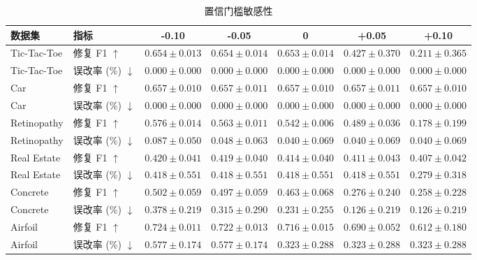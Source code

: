 \begin{table}[tb]
\centering
\caption{置信门槛敏感性}
\label{tab:threshold-main}
\fontsize{8}{9.6}\selectfont
\setlength{\tabcolsep}{3pt}
\renewcommand{\arraystretch}{1.10}
\begin{tabular*}{\textwidth}{@{\extracolsep{\fill}}llccccc@{}}
\toprule
数据集 & 指标 & -0.10 & -0.05 & 0 & +0.05 & +0.10 \\
\midrule
Tic-Tac-Toe & 修复 F1 $\uparrow$ & $0.654\pm0.013$ & $0.654\pm0.014$ & $0.653\pm0.014$ & $0.427\pm0.370$ & $0.211\pm0.365$ \\
Tic-Tac-Toe & 误改率 (\%) $\downarrow$ & $0.000\pm0.000$ & $0.000\pm0.000$ & $0.000\pm0.000$ & $0.000\pm0.000$ & $0.000\pm0.000$ \\
\addlinespace[2pt]
Car & 修复 F1 $\uparrow$ & $0.657\pm0.010$ & $0.657\pm0.011$ & $0.657\pm0.010$ & $0.657\pm0.011$ & $0.657\pm0.010$ \\
Car & 误改率 (\%) $\downarrow$ & $0.000\pm0.000$ & $0.000\pm0.000$ & $0.000\pm0.000$ & $0.000\pm0.000$ & $0.000\pm0.000$ \\
\addlinespace[2pt]
Retinopathy & 修复 F1 $\uparrow$ & $0.576\pm0.014$ & $0.563\pm0.011$ & $0.542\pm0.006$ & $0.489\pm0.036$ & $0.178\pm0.199$ \\
Retinopathy & 误改率 (\%) $\downarrow$ & $0.087\pm0.050$ & $0.048\pm0.063$ & $0.040\pm0.069$ & $0.040\pm0.069$ & $0.040\pm0.069$ \\
\addlinespace[2pt]
Real Estate & 修复 F1 $\uparrow$ & $0.420\pm0.041$ & $0.419\pm0.040$ & $0.414\pm0.040$ & $0.411\pm0.043$ & $0.407\pm0.042$ \\
Real Estate & 误改率 (\%) $\downarrow$ & $0.418\pm0.551$ & $0.418\pm0.551$ & $0.418\pm0.551$ & $0.418\pm0.551$ & $0.279\pm0.318$ \\
\addlinespace[2pt]
Concrete & 修复 F1 $\uparrow$ & $0.502\pm0.059$ & $0.497\pm0.059$ & $0.463\pm0.068$ & $0.276\pm0.240$ & $0.258\pm0.228$ \\
Concrete & 误改率 (\%) $\downarrow$ & $0.378\pm0.219$ & $0.315\pm0.290$ & $0.231\pm0.255$ & $0.126\pm0.219$ & $0.126\pm0.219$ \\
\addlinespace[2pt]
Airfoil & 修复 F1 $\uparrow$ & $0.724\pm0.011$ & $0.722\pm0.013$ & $0.716\pm0.015$ & $0.690\pm0.052$ & $0.612\pm0.180$ \\
Airfoil & 误改率 (\%) $\downarrow$ & $0.577\pm0.174$ & $0.577\pm0.174$ & $0.323\pm0.288$ & $0.323\pm0.288$ & $0.323\pm0.288$ \\
\bottomrule
\end{tabular*}
\end{table}
